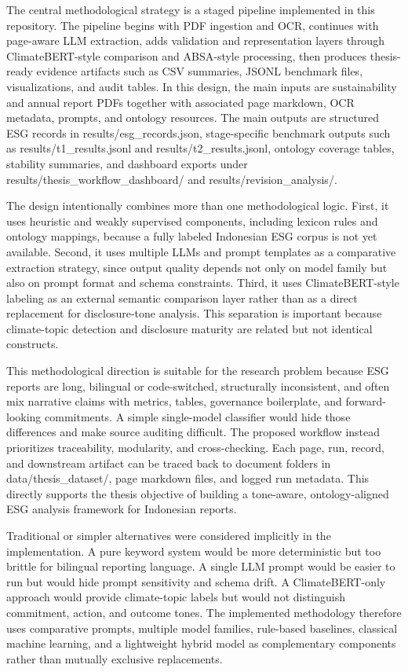 \documentclass[english, online, cse, master]{dithesis}
\begin{document}
The central methodological strategy is a staged pipeline implemented in this repository. The pipeline begins with PDF ingestion and OCR, continues with page-aware LLM extraction, adds validation and representation layers through ClimateBERT-style comparison and ABSA-style processing, then produces thesis-ready evidence artifacts such as CSV summaries, JSONL benchmark files, visualizations, and audit tables. In this design, the main inputs are sustainability and annual report PDFs together with associated page markdown, OCR metadata, prompts, and ontology resources. The main outputs are structured ESG records in results/esg\_records.json, stage-specific benchmark outputs such as results/t1\_results.jsonl and results/t2\_results.jsonl, ontology coverage tables, stability summaries, and dashboard exports under results/thesis\_workflow\_dashboard/ and results/revision\_analysis/.

The design intentionally combines more than one methodological logic. First, it uses heuristic and weakly supervised components, including lexicon rules and ontology mappings, because a fully labeled Indonesian ESG corpus is not yet available. Second, it uses multiple LLMs and prompt templates as a comparative extraction strategy, since output quality depends not only on model family but also on prompt format and schema constraints. Third, it uses ClimateBERT-style labeling as an external semantic comparison layer rather than as a direct replacement for disclosure-tone analysis. This separation is important because climate-topic detection and disclosure maturity are related but not identical constructs.

This methodological direction is suitable for the research problem because ESG reports are long, bilingual or code-switched, structurally inconsistent, and often mix narrative claims with metrics, tables, governance boilerplate, and forward-looking commitments. A simple single-model classifier would hide those differences and make source auditing difficult. The proposed workflow instead prioritizes traceability, modularity, and cross-checking. Each page, run, record, and downstream artifact can be traced back to document folders in data/thesis\_dataset/, page markdown files, and logged run metadata. This directly supports the thesis objective of building a tone-aware, ontology-aligned ESG analysis framework for Indonesian reports.

Traditional or simpler alternatives were considered implicitly in the implementation. A pure keyword system would be more deterministic but too brittle for bilingual reporting language. A single LLM prompt would be easier to run but would hide prompt sensitivity and schema drift. A ClimateBERT-only approach would provide climate-topic labels but would not distinguish commitment, action, and outcome tones. The implemented methodology therefore uses comparative prompts, multiple model families, rule-based baselines, classical machine learning, and a lightweight hybrid model as complementary components rather than mutually exclusive replacements.
\end{document}
